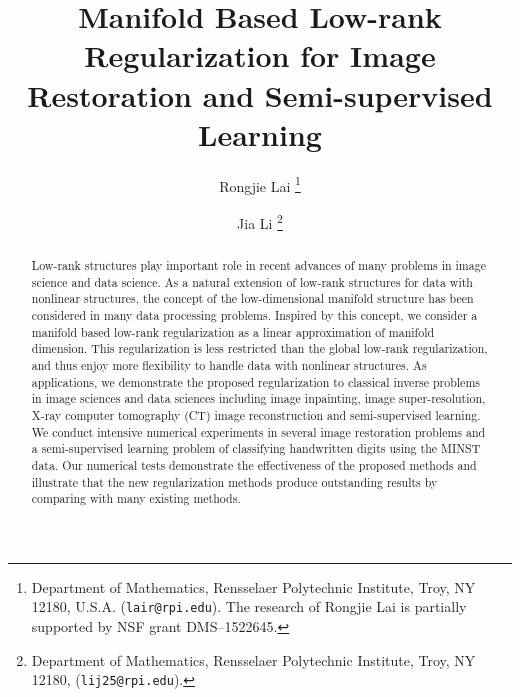 \documentclass[letterpaper,10pt]{article}
\title{Manifold Based Low-rank Regularization for Image Restoration and Semi-supervised Learning
}
\author{Rongjie Lai
\thanks{Department of Mathematics, Rensselaer Polytechnic Institute, Troy, NY 12180,
         U.S.A. ({\tt lair@rpi.edu}). The research of Rongjie Lai is partially supported by NSF grant DMS--1522645.}
        \and Jia Li
        \thanks{Department of Mathematics, Rensselaer Polytechnic Institute, Troy, NY 12180,  ({\tt lij25@rpi.edu}).}
        }
\date{}
\begin{document}
\maketitle
\begin{abstract}
Low-rank structures play important role in recent advances of many problems in image science and data science. As a natural extension of low-rank structures for data with nonlinear structures, the concept of the low-dimensional manifold structure has been considered in many data processing problems. Inspired by this concept, we consider a manifold based low-rank regularization as a linear approximation of manifold dimension. This regularization is less restricted than the global low-rank regularization, and thus enjoy more flexibility to handle data with nonlinear structures. As applications, we demonstrate the proposed regularization to classical inverse problems in image sciences and data sciences including image inpainting, image super-resolution, X-ray computer tomography (CT) image reconstruction and semi-supervised learning. We conduct intensive numerical experiments in several image restoration problems and a semi-supervised learning problem of classifying handwritten digits using the MINST data. Our numerical tests demonstrate the effectiveness of the proposed methods and illustrate that the new regularization methods produce outstanding results by comparing with many existing methods.
\end{abstract}
\end{document}
